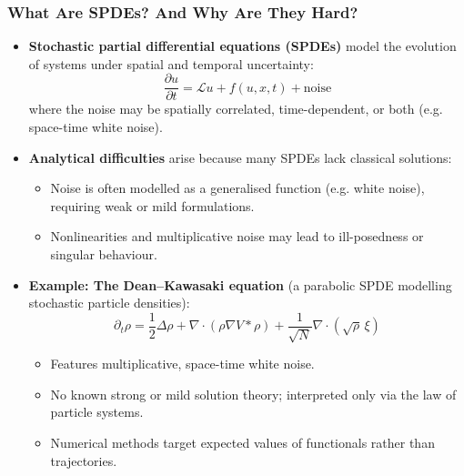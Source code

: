 \documentclass[aspectratio=169]{beamer}
\begin{document}
\begin{frame}
  \frametitle{What Are SPDEs? And Why Are They Hard?}

  \begin{itemize}
    \item \textbf{Stochastic partial differential equations (SPDEs)} model the evolution of systems under spatial and temporal uncertainty:
    \[
      \frac{\partial u}{\partial t} = \mathcal{L} u + f(u, x, t) + \text{noise}
    \]
    where the noise may be spatially correlated, time-dependent, or both (e.g. space-time white noise).

    \item \textbf{Analytical difficulties} arise because many SPDEs lack classical solutions:
    \begin{itemize}
      \item Noise is often modelled as a generalised function (e.g. white noise), requiring weak or mild formulations.
      \item Nonlinearities and multiplicative noise may lead to ill-posedness or singular behaviour.
    \end{itemize}

    \item \textbf{Example: The Dean–Kawasaki equation} (a parabolic SPDE modelling stochastic particle densities):
    \[
      \partial_t \rho = \frac{1}{2} \Delta \rho + \nabla \cdot (\rho \nabla V * \rho) + \frac{1}{\sqrt{N}} \nabla \cdot (\sqrt{\rho} \, \xi)
    \]
    \begin{itemize}
      \item Features multiplicative, space-time white noise.
      \item No known strong or mild solution theory; interpreted only via the law of particle systems.
      \item Numerical methods target expected values of functionals rather than trajectories.
    \end{itemize}
  \end{itemize}
\end{frame}
\end{document}
